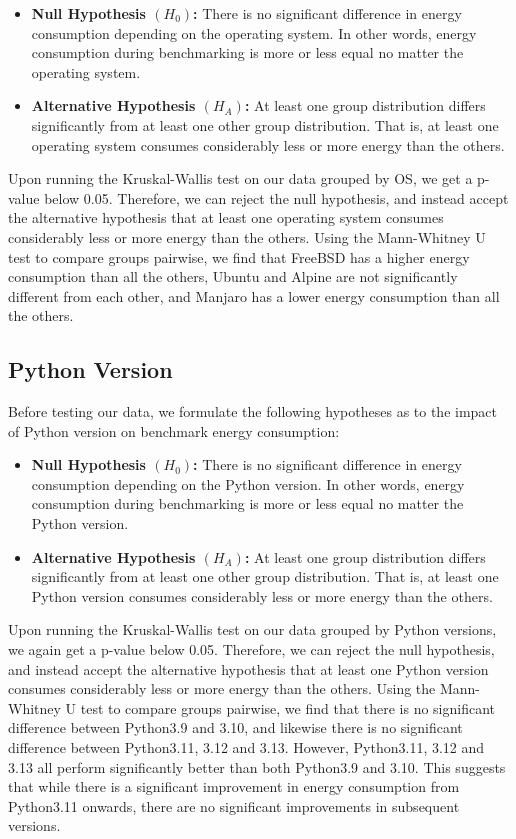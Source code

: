 \begin{itemize}[label={}]
    \item \textbf{Null Hypothesis $(H_0)$:}
    There is no significant difference in energy consumption depending on the operating system. In other words, energy consumption during benchmarking is more or less equal no matter the operating system.
    \item \textbf{Alternative Hypothesis $(H_A)$:} At least one group distribution differs significantly from at least one other group distribution. That is, at least one operating system consumes considerably less or more energy than the others.
\end{itemize}

Upon running the Kruskal-Wallis test on our data grouped by OS, we get a p-value below 0.05. Therefore, we can reject the null hypothesis, and instead accept the alternative hypothesis that at least one operating system consumes considerably less or more energy than the others. Using the Mann-Whitney U test to compare groups pairwise, we find that FreeBSD has a higher energy consumption than all the others, Ubuntu and Alpine are not significantly different from each other, and Manjaro has a lower energy consumption than all the others. 

\subsection*{Python Version}
Before testing our data, we formulate the following hypotheses as to the impact of Python version on benchmark energy consumption:

\begin{itemize}[label={}]
    \item \textbf{Null Hypothesis $(H_0)$:}
    There is no significant difference in energy consumption depending on the Python version. In other words, energy consumption during benchmarking is more or less equal no matter the Python version.
    \item \textbf{Alternative Hypothesis $(H_A)$:} At least one group distribution differs significantly from at least one other group distribution. That is, at least one Python version consumes considerably less or more energy than the others.
\end{itemize}

Upon running the Kruskal-Wallis test on our data grouped by Python versions, we again get a p-value below 0.05. Therefore, we can reject the null hypothesis, and instead accept the alternative hypothesis that at least one Python version consumes considerably less or more energy than the others. Using the Mann-Whitney U test to compare groups pairwise, we find that there is no significant difference between Python3.9 and 3.10, and likewise there is no significant difference between Python3.11, 3.12 and 3.13. However, Python3.11, 3.12 and 3.13 all perform significantly better than both Python3.9 and 3.10. This suggests that while there is a significant improvement in energy consumption from Python3.11 onwards, there are no significant improvements in subsequent versions.

